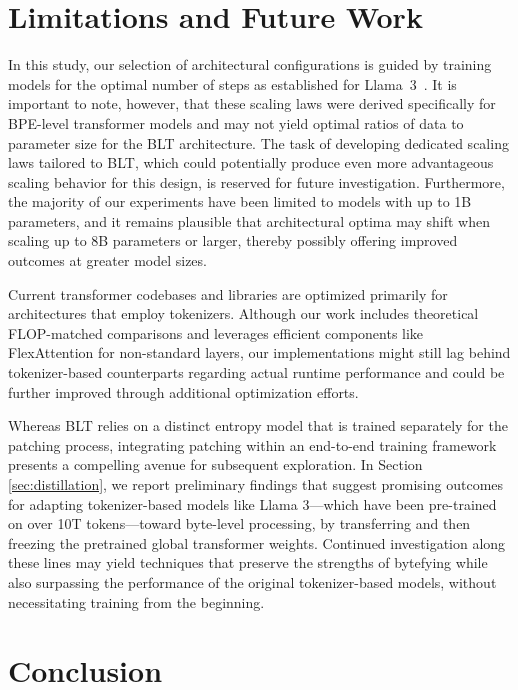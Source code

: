 \section{Limitations and Future Work}

In this study, our selection of architectural configurations is guided by training models for the optimal number of steps as established for Llama~3~\citep{dubey2024llama}. It is important to note, however, that these scaling laws were derived specifically for BPE-level transformer models and may not yield optimal ratios of data to parameter size for the {\textsc BLT} architecture. The task of developing dedicated scaling laws tailored to {\textsc BLT}, which could potentially produce even more advantageous scaling behavior for this design, is reserved for future investigation. Furthermore, the majority of our experiments have been limited to models with up to 1B parameters, and it remains plausible that architectural optima may shift when scaling up to 8B parameters or larger, thereby possibly offering improved outcomes at greater model sizes.

Current transformer codebases and libraries are optimized primarily for architectures that employ tokenizers. Although our work includes theoretical FLOP-matched comparisons and leverages efficient components like FlexAttention for non-standard layers, our implementations might still lag behind tokenizer-based counterparts regarding actual runtime performance and could be further improved through additional optimization efforts.

Whereas {\textsc BLT} relies on a distinct entropy model that is trained separately for the patching process, integrating patching within an end-to-end training framework presents a compelling avenue for subsequent exploration. In Section \ref{sec:distillation}, we report preliminary findings that suggest promising outcomes for adapting tokenizer-based models like Llama 3—which have been pre-trained on over 10T tokens—toward byte-level processing, by transferring and then freezing the pretrained global transformer weights. Continued investigation along these lines may yield techniques that preserve the strengths of bytefying while also surpassing the performance of the original tokenizer-based models, without necessitating training from the beginning.

\section{Conclusion}
\label{section:conclusion}

